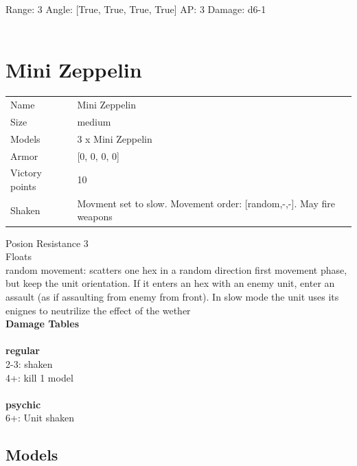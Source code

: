 Range: 3  Angle: [True, True, True, True] AP: 3 Damage: d6-1 \\




 
\ \\














\clearpage

\section{ Mini Zeppelin }

\begin{tabular}{ll}
  Name & Mini Zeppelin \\
  Size & medium\\
  Models & 3 x Mini Zeppelin\\
  Armor & [0, 0, 0, 0]\\
  Victory points & 10\\
  Shaken & Movment set to slow. Movement order: [random,-,-]. May fire weapons\\
\end{tabular}

Posion Resistance 3\\ 
Floats\\ 
random movement: scatters one hex in a random direction first movement phase, but keep the unit orientation. If it enters an hex with an enemy unit, enter an assault (as if assaulting from enemy from front). In slow mode the unit uses its enignes to neutrilize the effect of the wether\\ 



{\bf Damage Tables} \\
\ \\ {\bf regular } \\
2-3: shaken \\
4+: kill 1 model \\
\ \\ {\bf psychic } \\
6+: Unit shaken \\


\clearpage

\subsection{ Models }

